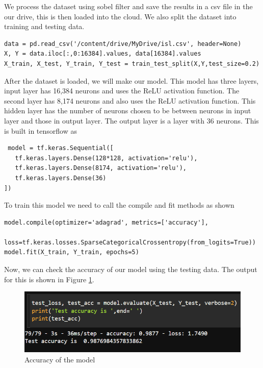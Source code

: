 \documentclass[a4paper,oneside,12pt]{report}
\begin{document}
We process the dataset using sobel filter and save the results in a csv file in the our drive, this is then loaded into the cloud. We also split the dataset into training and testing data.

\begin{verbatim}
data = pd.read_csv('/content/drive/MyDrive/isl.csv', header=None)
X, Y = data.iloc[:,0:16384].values, data[16384].values
X_train, X_test, Y_train, Y_test = train_test_split(X,Y,test_size=0.2)
\end{verbatim}

After the dataset is loaded, we will make our model. This model has three layers, input layer has 16,384 neurons and uses the ReLU activation function. The second layer has 8,174 neurons and also uses the ReLU activation function. This hidden layer has the number of neurons chosen to be between neurons in input layer and those in output layer. The output layer is a layer with 36 neurons. This is built in tensorflow as

\begin{verbatim}
 model = tf.keras.Sequential([
   tf.keras.layers.Dense(128*128, activation='relu'),
   tf.keras.layers.Dense(8174, activation='relu'),
   tf.keras.layers.Dense(36)
])
\end{verbatim}

To train this model we need to call the compile and fit methods as shown

\begin{verbatim}
model.compile(optimizer='adagrad', metrics=['accuracy'],
	      loss=tf.keras.losses.SparseCategoricalCrossentropy(from_logits=True))
model.fit(X_train, Y_train, epochs=5)
\end{verbatim}

Now, we can check the accuracy of our model using the testing data. The output for this is shown in Figure \ref{fig:org6091b20}. 

\begin{figure}[htbp]
\centering
\includegraphics[width=.9\linewidth]{Neural_Network/2025-04-28_01-55-46_accuracy_of_model.png}
\caption{\label{fig:org6091b20}Accuracy of the model}
\end{figure}
\end{document}
